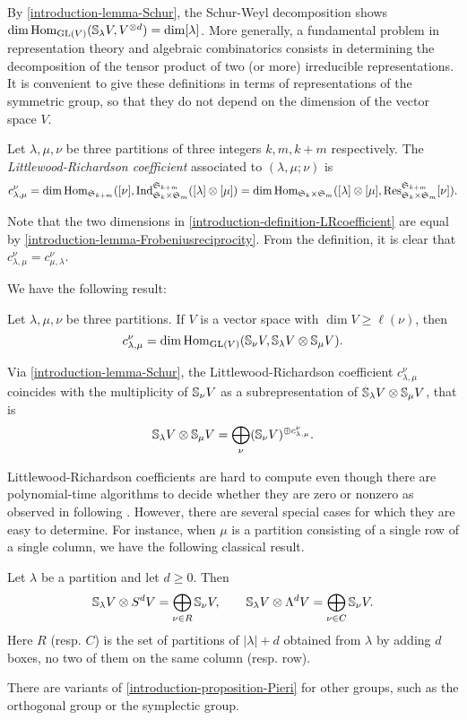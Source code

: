 By \ref{introduction-lemma-Schur}, the Schur-Weyl decomposition shows $\dim \operatorname{Hom}_{\mathrm{GL}(V)} ( \mathbb{S}_\lambda V, V^{\otimes d}) = \dim [\lambda]$. More generally, a fundamental problem in representation theory and algebraic combinatorics consists in determining the decomposition of the tensor product of two (or more) irreducible representations. It is convenient to give these definitions in terms of representations of the symmetric group, so that they do not depend on the dimension of the vector space $V$.

\begin{definition}
 \label{introduction-definition-LRcoefficient}
 Let $\lambda,\mu,\nu$ be three partitions of three integers $k,m, k+m$ respectively. The {\it Littlewood-Richardson coefficient} associated to $(\lambda,\mu;\nu)$ is 
 \[
c^\nu_{\lambda,\mu} = 
\dim \operatorname{Hom}_{\mathfrak{S}_{k+m}} ([\nu], \operatorname{Ind}_{\mathfrak{S}_k \times \mathfrak{S}_m}^{\mathfrak{S}_{k+m}} ([\lambda] \otimes [\mu]) = 
\dim \operatorname{Hom}_{\mathfrak{S}_{k} \times \mathfrak{S}_m} ([\lambda] \otimes [\mu] , \operatorname{Res}_{\mathfrak{S}_k \times \mathfrak{S}_m}^{\mathfrak{S}_{k+m}} [\nu]).
\]
\end{definition}
Note that the two dimensions in \ref{introduction-definition-LRcoefficient} are equal by \ref{introduction-lemma-Frobeniusreciprocity}. From the definition, it is clear that $c^\nu_{\lambda,\mu} = c^\nu_{\mu,\lambda}$. 

We have the following result:
\begin{lemma}
 \label{introduction-lemma-LRcoefficientGL}
  Let $\lambda,\mu,\nu$ be three partitions. If $V$ is a vector space with $\dim V \geq \ell(\nu)$, then 
 \[
c^\nu_{\lambda,\mu} = \dim \operatorname{Hom}_{\mathrm{GL}(V)} (\mathbb{S}_\nu V,  \mathbb{S}_\lambda V \otimes \mathbb{S}_\mu V ).
\]
\end{lemma}
Via \ref{introduction-lemma-Schur}, the Littlewood-Richardson coefficient $c^\nu_{\lambda,\mu} $ coincides with the multiplicity of $\mathbb{S}_\nu V$ as a subrepresentation of $ \mathbb{S}_\lambda V \otimes \mathbb{S}_\mu V $, that is 
\[
 \mathbb{S}_\lambda V \otimes \mathbb{S}_\mu V  = \bigoplus_{\nu } (\mathbb{S}_{\nu} V )^{\oplus c^\nu_{\lambda,\mu} }.
\]

Littlewood-Richardson coefficients are hard to compute \cite{Nar06} even though there are polynomial-time algorithms to decide whether they are zero or nonzero as observed in \cite{MNS12} following \cite{KT99}. However, there are several special cases for which they are easy to determine. For instance, when $\mu$ is a partition consisting of a single row of a single column, we have the following classical result.
\begin{proposition}
\label{introduction-proposition-Pieri}
 Let $\lambda$ be a partition and let $d \geq 0$. Then 
 \[
 \mathbb{S}_{\lambda} V \otimes S^d V = \bigoplus_{\nu \in R} \mathbb{S}_{\nu} V, \qquad  \mathbb{S}_{\lambda} V \otimes \Lambda^d V = \bigoplus_{\nu \in C} \mathbb{S}_{\nu} V.
 \]
Here $R$ (resp. $C$) is the set of partitions of $|\lambda|+d$ obtained from $\lambda$ by adding $d$ boxes, no two of them on the same column (resp. row).
\end{proposition}
There are variants of \ref{introduction-proposition-Pieri} for other groups, such as the orthogonal group or the symplectic group.


